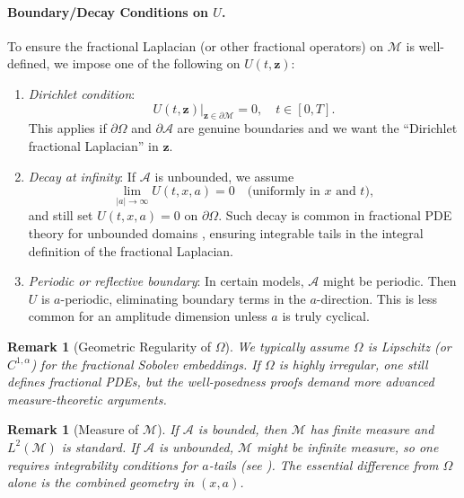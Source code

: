 \documentclass[12pt]{article}
\newtheorem{remark}[theorem]{Remark}
\begin{document}
\paragraph{Boundary/Decay Conditions on $U$.}
To ensure the fractional Laplacian (or other fractional operators) on \(\mathcal{M}\) 
is well-defined, we impose one of the following on \(U(t,\mathbf{z})\):

\begin{enumerate}
\item \emph{Dirichlet condition}:
  \[
     U(t,\mathbf{z})\big|_{\mathbf{z}\in \partial \mathcal{M}} = 0,
     \quad
     t \in [0,T].
  \]
  This applies if \(\partial \Omega\) and \(\partial \mathcal{A}\) are genuine boundaries 
  and we want the ``Dirichlet fractional Laplacian'' in \(\mathbf{z}\).

\item \emph{Decay at infinity}:
  If \(\mathcal{A}\) is unbounded, we assume
  \[
    \lim_{\lvert a\rvert \to \infty} U(t,x,a) = 0
    \quad\text{(uniformly in $x$ and $t$)},
  \]
  and still set \(U(t,x,a)=0\) on \(\partial\Omega\).  Such decay is common in fractional 
  PDE theory for unbounded domains \cite{Kilbas2006}, ensuring integrable tails in the 
  integral definition of the fractional Laplacian.

\item \emph{Periodic or reflective boundary}: 
  In certain models, \(\mathcal{A}\) might be periodic.  Then $U$ is $a$-periodic, 
  eliminating boundary terms in the $a$-direction. This is less common for an amplitude 
  dimension unless $a$ is truly cyclical.
\end{enumerate}

\begin{remark}[Geometric Regularity of \(\Omega\)]
We typically assume \(\Omega\) is Lipschitz (or $C^{1,\alpha}$) for the fractional 
Sobolev embeddings. If \(\Omega\) is highly irregular, one still defines fractional PDEs, 
but the well-posedness proofs demand more advanced measure-theoretic arguments.
\end{remark}

\begin{remark}[Measure of \(\mathcal{M}\)]
If \(\mathcal{A}\) is bounded, then \(\mathcal{M}\) has finite measure and $L^2(\mathcal{M})$ 
is standard.  If \(\mathcal{A}\) is unbounded, $\mathcal{M}$ might be infinite measure, so 
one requires integrability conditions for $a$-tails (see \cite{DiNezzaPalatucciValdinoci}).  The essential 
difference from $\Omega$ alone is the \emph{combined geometry} in $(x,a)$.
\end{remark}
\end{document}
